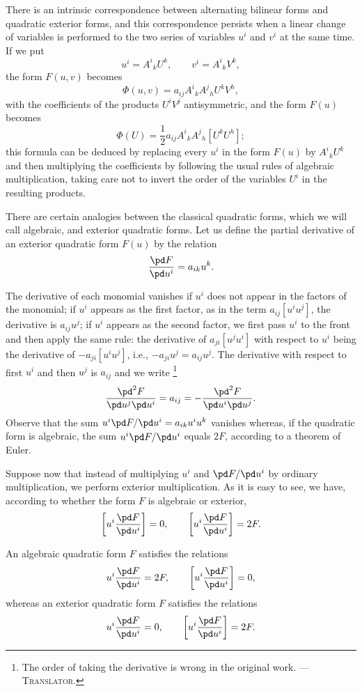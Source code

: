 There is an intrinsic correspondence between alternating bilinear forms and quadratic exterior forms, and this correspondence persists when a linear change of variables is performed  to the two series of variables $u^{i}$ and $v^{i}$ at the same time. If we put
\[
u^{i}=A^{i}{}_{k}U^{k},\qquad v^{i}=A^{i}{}_{k}V^{k},
\]
the form $F(u,v)$ becomes
\[
\Phi(u,v)=a_{ij}A^{i}{}_{k}A^{j}{}_{h}U^{k}V^{h},
\]
with the coefficients of the products $U^{i}V^{j}$ antisymmetric, and the form $F(u)$ becomes
\[
\Phi(U)=\frac{1}{2}a_{ij}A^{i}{}_{k}A^{j}{}_{h}[U^{k}U^{h}];
\]
this formula can be deduced by replacing every $u^{i}$ in the form $F(u)$ by $A^{i}{}_{k}U^{k}$ and then multiplying the coefficients by following the usual rules of algebraic multiplication,  taking care not to invert the order of the variables $U^{i}$ in the resulting products.

\vspace{12pt}\fsec There are certain analogies between the classical quadratic forms, which we will call algebraic, and exterior quadratic forms. Let us define the partial derivative of an exterior quadratic form $F(u)$ by the relation
\[
\frac{\pd F}{\pd u^{i}}=a_{ik}u^{k}.
\]

The derivative of each monomial vanishes if $u^{i}$ does not appear in the factors of the monomial; if $u^{i}$ appears as the first factor, as in the term $a_{ij}[u^{i}u^{j}]$, the derivative is $a_{ij}u^{j}$; if $u^{i}$ appears as the second factor, we first pass $u^{i}$ to the front and  then apply the same rule: the derivative of $a_{ji}[u^{j}u^{i}]$ with respect to $u^{i}$ being the derivative of $-a_{ji}[u^{i}u^{j}]$, {i.e.}, $-a_{ji}u^{j}=a_{ij}u^{j}$. The derivative with respect to first $u^{i}$ and then $u^{j}$ is $a_{ij}$ and we write \footnote{The order of taking the derivative is wrong in the original work. --- \textsc{Translator.}}
\[
\frac{\pd ^{2}F}{\pd u^{j}\pd u^{i}}=a_{ij}=-\frac{\pd^{2}F}{\pd u^{i}\pd u^{j}}.
\]
Observe that the sum $u^{i}\pd F/\pd u^{i}=a_{ik}u^{i}u^{k}$ vanishes whereas, if the quadratic form is algebraic, the sum $u^{i}\pd F/\pd u^{i}$ equals $2F$, according to a theorem of Euler.

Suppose now that instead of multiplying $u^{i}$ and $\pd F/\pd u^{i}$ by ordinary multiplication, we perform exterior multiplication. As it is easy to see, we have, according to whether the form $F$ is algebraic or exterior,
\begin{equation}
  \label{eq:3}
  \left[u^{i}\frac{\pd F}{\pd u^{i}}\right]=0,\qquad
  \left[u^{i}\frac{\pd F}{\pd u^{i}}\right]=2F.
\end{equation}
\begin{thm*}
  An algebraic quadratic form $F$ satisfies the relations
\[
u^{i}\frac{\pd F}{\pd u^{i}}=2F,\qquad\left[u^{i}\frac{\pd F}{\pd u^{i}}\right]=0,
\]
whereas an exterior quadratic form $F$ satisfies the relations
\[
u^{i}\frac{\pd F}{\pd u^{i}}=0,\qquad\left[u^{i}\frac{\pd F}{\pd u^{i}}\right]=2F.
\]
\end{thm*}


